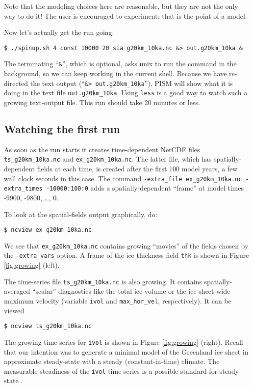 Note that the modeling choices here are reasonable, but they are not the only way to do it! The user is encouraged to experiment; that is the point of a model.

Now let's actually get the run going:
\begin{verbatim}
$ ./spinup.sh 4 const 10000 20 sia g20km_10ka.nc &> out.g20km_10ka &
\end{verbatim}
\noindent The terminating ``\verb|&|'', which is optional, asks unix to run the command in the background, so we can keep working in the current shell.  Because we have re-directed the text output (``\verb|&> out.g20km_10ka|''), PISM will show what it is doing in the text file \texttt{out.g20km_10ka}.  Using \texttt{less} is a good way to watch such a growing text-output file.  This run should take 20 minutes or less.


\subsection{Watching the first run}  \label{subsect:watchrun}  As soon as the run starts it creates time-dependent NetCDF files \texttt{ts_g20km_10ka.nc} and \texttt{ex_g20km_10ka.nc}.  The latter file, which has spatially-dependent fields at each time, is created after the first 100 model years, a few wall clock seconds in this case.  The command \texttt{-extra_file ex_g20km_10ka.nc -extra_times -10000:100:0} adds a spatially-dependent ``frame'' at model times -9900, -9800, \dots, 0.

To look at the spatial-fields output graphically, do:
\begin{verbatim}
$ ncview ex_g20km_10ka.nc
\end{verbatim}
We see that \texttt{ex_g20km_10ka.nc} contains growing ``movies'' of the fields chosen by the \texttt{-extra_vars} option.  A frame of the ice thickness field \texttt{thk} is shown in Figure \ref{fig:growing} (left).

The time-series file \texttt{ts_g20km_10ka.nc} is also growing.  It contains spatially-averaged ``scalar'' diagnostics like the total ice volume or the ice-sheet-wide maximum velocity (variable \texttt{ivol} and \texttt{max_hor_vel}, respectively).  It can be viewed
\begin{verbatim}
$ ncview ts_g20km_10ka.nc
\end{verbatim}
The growing time series for \texttt{ivol} is shown in Figure \ref{fig:growing} (right).  Recall that our intention was to generate a minimal model of the Greenland ice sheet in approximate steady-state with a steady (constant-in-time) climate.  The measurable steadiness of the \texttt{ivol} time series is a possible standard for steady state \cite[for example]{EISMINT00}.

